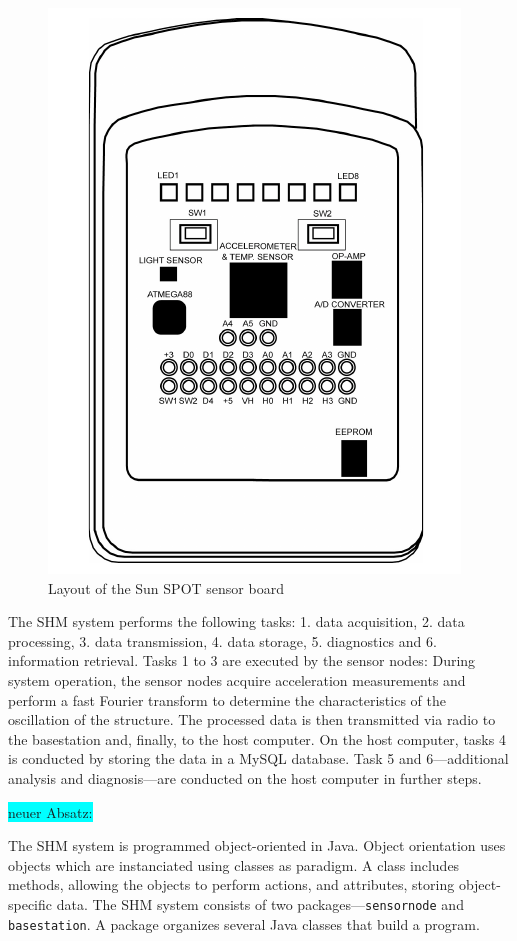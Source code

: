 \documentclass[12pt,a4paper]{scrartcl}
\begin{document}
\begin{figure}[ht]
    \centering
    \includegraphics[scale=0.5]{figures/eDemoboard.png}
    \caption{Layout of the Sun SPOT sensor board \cite{spotToO}}
    \label{fig:SPOT}
\end{figure}

The SHM system performs the following tasks:
1. data acquisition,
2. data processing,
3. data transmission, 
4. data storage,
5. diagnostics and 
6. information retrieval.
Tasks 1 to 3 are executed by the sensor nodes: During system operation, the sensor nodes acquire acceleration measurements and perform a fast Fourier transform to determine the characteristics of the oscillation of the structure. 
The processed data is then transmitted via radio to the basestation and, finally, to the host computer.
On the host computer, tasks 4 is conducted by storing the data in a MySQL database.
Task 5 and 6---additional analysis and diagnosis---are conducted on the host computer in further steps.

\colorbox{cyan}{neuer Absatz:}

The SHM system is programmed object-oriented in Java. 
Object orientation uses objects which are instanciated using classes as paradigm. 
A class includes methods, allowing the objects to perform actions, and attributes, storing object-specific data.
The SHM system consists of two packages---\texttt{sensornode} and \texttt{basestation}.
A package organizes several Java classes that build a program.
\end{document}
